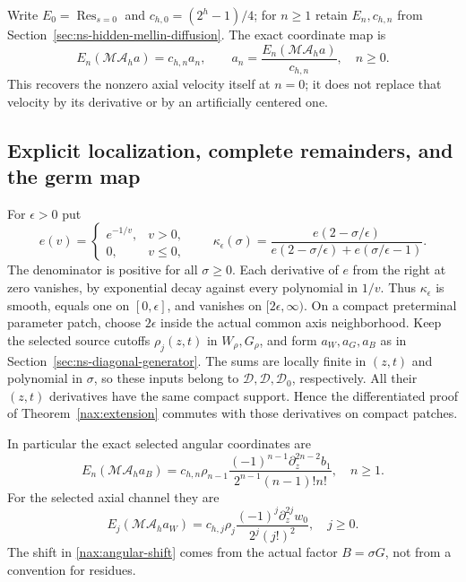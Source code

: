 Write $E_0=\operatorname{Res}_{s=0}$ and $c_{h,0}=(2^h-1)/4$;
for $n\geq1$ retain $E_n,c_{h,n}$ from
Section~\ref{sec:ns-hidden-mellin-diffusion}. The exact coordinate map is
\begin{equation}\label{nax:coordinates}
 E_n(\mathcal M\mathcal A_h a)=c_{h,n}a_n,\qquad
 a_n=\frac{E_n(\mathcal M\mathcal A_h a)}{c_{h,n}},\quad n\geq0.
\end{equation}
This recovers the nonzero axial velocity itself at $n=0$; it does not
replace that velocity by its derivative or by an artificially centered one.

\subsection{Explicit localization, complete remainders, and the germ map}

For $\epsilon>0$ put
\[
 e(v)=\begin{cases}e^{-1/v},&v>0,\\0,&v\leq0,\end{cases}
 \qquad
 \kappa_\epsilon(\sigma)=
 \frac{e(2-\sigma/\epsilon)}
 {e(2-\sigma/\epsilon)+e(\sigma/\epsilon-1)}.
\]
The denominator is positive for all $\sigma\geq0$. Each derivative
of $e$ from the right at zero vanishes, by exponential decay against
every polynomial in $1/v$. Thus $\kappa_\epsilon$ is smooth, equals
one on $[0,\epsilon]$, and vanishes on $[2\epsilon,\infty)$.
On a compact preterminal parameter patch, choose $2\epsilon$ inside
the actual common axis neighborhood. Keep the selected source cutoffs
$\rho_j(z,t)$ in $W_\rho,G_\rho$, and form $a_W,a_G,a_B$ as in
Section~\ref{sec:ns-diagonal-generator}. The sums are locally finite
in $(z,t)$ and polynomial in $\sigma$, so these inputs belong to
$\mathcal D,\mathcal D,\mathcal D_0$, respectively.
All their $(z,t)$ derivatives have the same compact support. Hence
the differentiated proof of Theorem~\ref{nax:extension} commutes with
those derivatives on compact patches.

In particular the exact selected angular coordinates are
\begin{equation}\label{nax:angular-shift}
 E_n(\mathcal M\mathcal A_h a_B)
   =c_{h,n}\rho_{n-1}
       \frac{(-1)^{n-1}\partial_z^{2n-2}b_1}
            {2^{n-1}(n-1)!n!},\quad n\geq1.
\end{equation}
For the selected axial channel they are
\begin{equation}\label{nax:axial-channel}
 E_j(\mathcal M\mathcal A_h a_W)
   =c_{h,j}\rho_j
       \frac{(-1)^j\partial_z^{2j}w_0}{2^j(j!)^2},\quad j\geq0.
\end{equation}
The shift in \eqref{nax:angular-shift} comes from the actual factor
$B=\sigma G$, not from a convention for residues.

